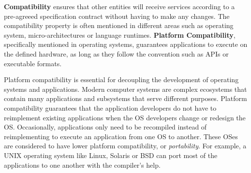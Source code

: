 \label{sec:background}



{\bf Compatibility} ensures that other entities will receive services according to a pre-agreeed specification contract without having to make any changes.
The compatibility property is often mentioned in different areas such as operating system, micro-architectures or language runtimes.
{\bf Platform Compatibility}, specifically mentioned in operating systems, guarantees applications to execute on the defined hardware,
as long as they follow the convention such as APIs or executable formats.


Platform compatibility is essential for decoupling the development of operating systems and applications.
Modern computer systems are complex ecosystems that contain 
many
applications and subsystems 
that serve different
purposes.
Platform compatibility guarantees that the application developers do not have to 
reimplement existing applications when the OS developers change or redesign the OS.
Occasionally, applications only need to be recompiled instead of reimplementing to execute an application from one OS to another. 
These OSes are considered to have lower platform compatibility, or {\em portability}.
For example, a UNIX operating system like Linux, Solaris or BSD can port most of the applications to one another with the compiler's help.

